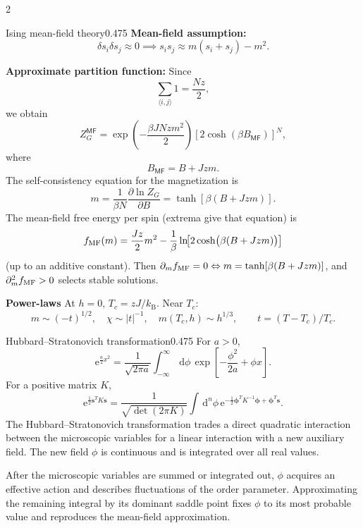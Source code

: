\documentclass[8pt,a4paper]{extarticle}
\newcommand{\dd}{\,\mathrm d}
\newcommand{\e}{\mathrm e}
\newcommand{\kb}{k_{\mathrm B}}
\begin{document}
\begin{multicols*}{2}
\begin{mytikzbox}{Ising mean-field theory}{0.475}
\textbf{Mean-field assumption:} \[ \delta s_i\delta s_j\approx0 \implies s_i s_j\approx m(s_i+s_j)-m^2. \] 

\textbf{Approximate partition function:} Since \[ \sum_{\langle i,j\rangle}1=\frac{Nz}{2}, \] we obtain \[ Z_G^{\mathsf{MF}} = \exp\left(-\frac{\beta JNz m^2}{2}\right) \left[ 2\cosh\left(\beta B_{\mathsf{MF}}\right) \right]^N, \] where \[ B_{\mathsf{MF}}=B+Jzm. \] The self-consistency equation for the magnetization is \[ m= \frac{1}{\beta N} \frac{\partial\ln Z_G}{\partial B} = \tanh\left[\beta(B+Jzm)\right]. \]
The mean-field free energy per spin (extrema give that equation) is
\[
f_{\rm MF}(m)=\frac{Jz}{2}m^2
-\frac1\beta\ln\!\bigl[2\cosh\bigl(\beta(B+Jzm)\bigr)\bigr]
\]
(up to an additive constant). Then
$\partial_m f_{\rm MF}=0\Leftrightarrow m=\tanh[\beta(B+Jzm)]$,
and $\partial_m^2 f_{\rm MF}>0$ selects stable solutions.

\textbf{Power-laws}
At $h=0$, $T_c=zJ/\kb$. Near $T_c$:
\[
m\sim(-t)^{1/2},\quad \chi\sim |t|^{-1},\quad
m(T_c,h)\sim h^{1/3},\qquad t=(T-T_c)/T_c.
\]
\end{mytikzbox}

\begin{mytikzbox}{Hubbard--Stratonovich transformation}{0.475}
For $a>0$,
\[
\e^{\frac a2x^2}=\frac1{\sqrt{2\pi a}}
\int_{-\infty}^{\infty}\dd\phi\,
\exp\!\left[-\frac{\phi^2}{2a}+\phi x\right].
\]
For a positive matrix $K$,
\[
\e^{\frac12\bm s^T K\bm s}
=\frac1{\sqrt{\det(2\pi K)}}\int\dd^n\phi\,
\e^{-\frac12\bm\phi^TK^{-1}\bm\phi+\bm\phi^T\bm s}.
\]
The Hubbard--Stratonovich transformation trades a direct quadratic interaction between the microscopic variables for a linear interaction with a new auxiliary field. The new field $\phi$ is continuous and is integrated over all real values.

After the microscopic variables are summed or integrated out, $\phi$ acquires an effective action and describes fluctuations of the order parameter. Approximating the remaining integral by its dominant saddle point fixes $\phi$ to its most probable value and reproduces the mean-field approximation.
\end{mytikzbox}


\end{multicols*}
\end{document}
